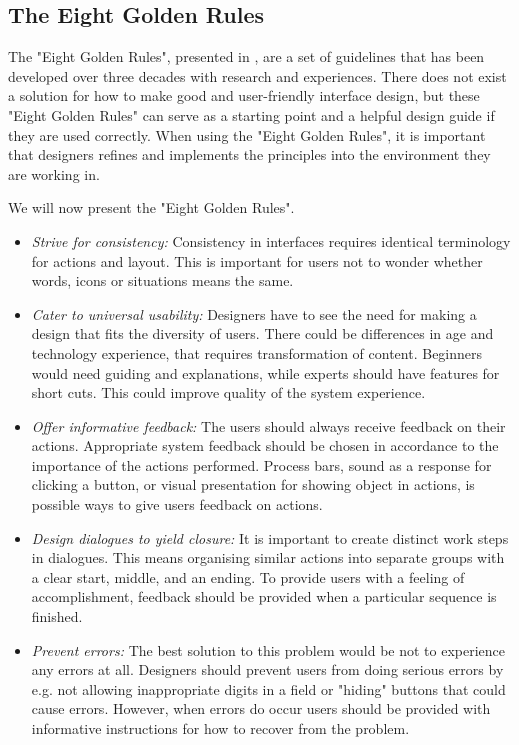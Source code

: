 \subsection{The Eight Golden Rules}
\label{subsec:golden}
The "Eight Golden Rules", presented in \cite{mmi}, are a set of guidelines that has been developed over three decades with research and experiences. There does not exist a solution for how to make good and user-friendly interface design, but these "Eight Golden Rules" can serve as a starting point and a helpful design guide if they are used correctly. When using the "Eight Golden Rules", it is important that designers refines and implements the principles into the environment they are working in. 

We will now present the "Eight Golden Rules".

\begin{itemize} 
\item \emph{Strive for consistency:} Consistency in interfaces requires identical terminology for actions and layout. This is important for users not to wonder whether words, icons or situations means the same. 
\item \emph{Cater to universal usability:} Designers have to see the need for making a design that fits the diversity of users. There could be differences in age and technology experience, that requires transformation of content. Beginners would need guiding and explanations, while experts should have features for short cuts. This could improve quality of the system experience. 
\item \emph{Offer informative feedback:} The users should always receive feedback on their actions. Appropriate system feedback should be chosen in accordance to the importance of the actions performed. Process bars, sound as a response for clicking a button, or visual presentation for showing object in actions, is possible ways to give users feedback on actions.  
\item \emph{Design dialogues to yield closure:} It is important to create distinct work steps in dialogues. This means organising similar actions into separate groups with a clear start, middle, and an ending. To provide users with a feeling of accomplishment, feedback should be provided when a particular sequence is finished.     
\item \emph{Prevent errors:} The best solution to this problem would be not to experience any errors at all. Designers should prevent users from doing serious errors by e.g. not allowing inappropriate digits in a field or "hiding" buttons that could cause errors. However, when errors do occur users should be provided with informative instructions for how to recover from the problem.   

\end{itemize}
